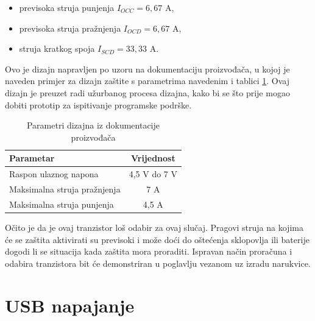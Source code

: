 \begin{itemize}
    \item previsoka struja punjenja $I_{OCC}=6,67\textrm{ A}$,
    \item previsoka struja pražnjenja $I_{OCD}=6,67\textrm{ A}$,
    \item struja kratkog spoja $I_{SCD}=33,33\textrm{ A}$.
\end{itemize}
Ovo je dizajn napravljen po uzoru na dokumentaciju proizvođača, u kojoj je naveden primjer za dizajn zaštite s parametrima navedenim i tablici \ref{tab:example}. Ovaj dizajn je preuzet radi užurbanog procesa dizajna, kako bi se što prije mogao dobiti prototip za ispitivanje programske podrške.
\begin{table}[htbp]
    \centering
    \caption{Parametri dizajna iz dokumentacije proizvođača \cite{ti:bq29700}}
    \begin{tabular}{|l|c|}
        \hline
        Parametar & Vrijednost \\
        \hline
        Raspon ulaznog napona & 4,5 V do 7 V \\
        \hline
        Maksimalna struja pražnjenja & 7 A \\
        \hline
        Maksimalna struja punjenja & 4,5 A \\
        \hline
    \end{tabular}
    \label{tab:example}
\end{table}
Očito je da je ovaj tranzistor loš odabir za ovaj slučaj. Pragovi struja na kojima će se zaštita aktivirati su previsoki i može doći do oštećenja sklopovlja ili baterije dogodi li se situacija kada zaštita mora proraditi. Ispravan način proračuna i odabira tranzistora bit će demonstriran u poglavlju vezanom uz izradu narukvice.

\section{USB napajanje}

